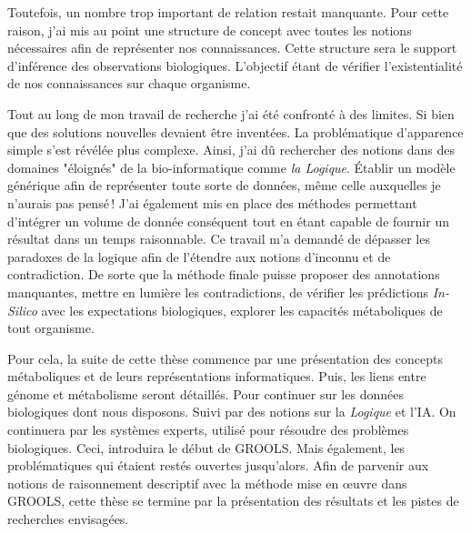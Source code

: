 \begin{refsegment}
Toutefois, un nombre trop important de relation restait manquante. Pour cette raison, j'ai mis au point une structure de concept avec toutes les notions nécessaires afin de représenter nos connaissances. Cette structure sera le support d'inférence des observations biologiques. L'objectif étant de vérifier l'existentialité de nos connaissances sur chaque organisme.

Tout au long de mon travail de recherche j'ai été confronté à des limites. Si bien que des solutions nouvelles devaient être inventées. La problématique d'apparence simple s'est révélée plus complexe. Ainsi, j'ai dû rechercher des notions dans des domaines "éloignés" de la bio-informatique comme \textit{la Logique}. Établir un modèle générique afin de représenter toute sorte de données, même celle auxquelles je n’aurais pas pensé ! J’ai également mis en place des méthodes permettant d'intégrer un volume de donnée conséquent tout en étant capable de fournir un résultat dans un temps raisonnable. Ce travail m’a demandé de dépasser les paradoxes de la logique afin de l'étendre aux notions d'inconnu et de contradiction. De sorte que la méthode finale puisse proposer des annotations manquantes, mettre en lumière les contradictions, de vérifier les prédictions \textit{In-Silico} avec les expectations biologiques, explorer les capacités métaboliques de tout organisme.

Pour cela, la suite de cette thèse commence par une présentation des concepts métaboliques et de leurs représentations informatiques. Puis, les liens entre génome et métabolisme seront détaillés. Pour continuer sur les données biologiques dont nous disposons. Suivi par des notions sur la \textit{Logique} et l'\gls{IA}. On continuera par les systèmes experts, utilisé pour résoudre des problèmes biologiques. Ceci, introduira le début de GROOLS. Mais également, les problématiques qui étaient restés ouvertes jusqu'alors. Afin de parvenir aux notions de raisonnement descriptif avec la méthode mise en œuvre dans GROOLS, cette thèse se termine par la présentation des résultats et les pistes de recherches envisagées.


\subbibliography
\end{refsegment}